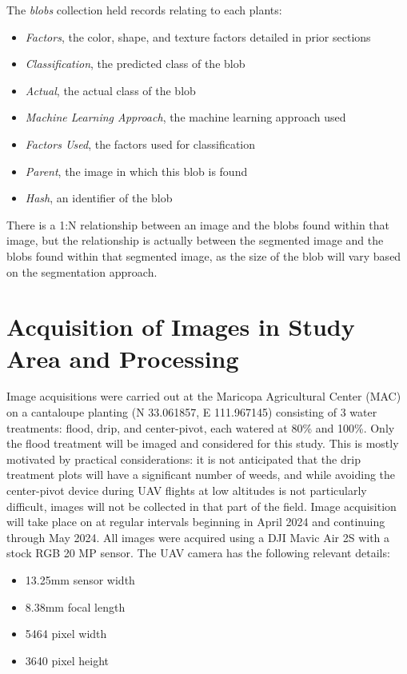 \documentclass[letterpaper]{article}
\begin{document}
{ The \textit{blobs} collection held records relating to each plants:
 \begin{itemize}
 	\item{\textit{Factors}, the color, shape, and texture factors detailed in prior sections}	
	\item{\textit{Classification}, the predicted class of the blob}	
	\item{\textit{Actual}, the actual class of the blob}	
	\item{\textit{Machine Learning Approach}, the machine learning approach used}	
	\item{\textit{Factors Used}, the factors used for classification}	
	\item{\textit{Parent}, the image in which this blob is found}
	\item{\textit{Hash}, an identifier of the blob}	
 \end{itemize}

There is a 1:N relationship between an image and the blobs found within that image, but the relationship is actually between the segmented image and the blobs found within that segmented image, as the size of the blob will vary based on the segmentation approach.

% 
%
\section{Acquisition of Images in Study Area and Processing}
Image acquisitions were carried out at the Maricopa Agricultural Center (MAC) on a cantaloupe planting (N 33.061857, E 111.967145) consisting of 3 water treatments: flood, drip, and center-pivot, each watered at 80\% and 100\%. Only the flood treatment will be imaged and considered for this study. This is mostly motivated by practical considerations: it is not anticipated that the drip treatment plots will have a significant number of weeds, and while avoiding the center-pivot device during UAV flights at low altitudes is not particularly difficult, images will not be collected in that part of the field.  Image acquisition will take place on at regular intervals beginning in April 2024 and continuing through May 2024. All images were acquired using a DJI Mavic Air 2S with a stock RGB 20 MP sensor. The UAV camera has the following relevant details:

\begin{itemize}
	\item{13.25mm sensor width}
	\item{8.38mm focal length}
	\item{5464 pixel width}
	\item{3640 pixel height}
\end{itemize}

}
\end{document}
